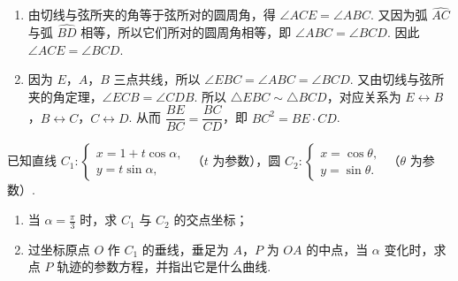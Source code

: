 \begin{solution}
\begin{enumerate}
\item 由切线与弦所夹的角等于弦所对的圆周角，得 \(\angle ACE=\angle ABC\). 又因为弧 \(\widehat{AC}\) 与弧 \(\widehat{BD}\) 相等，所以它们所对的圆周角相等，即 \(\angle ABC=\angle BCD\). 因此 \(\angle ACE=\angle BCD\).

\item 因为 \(E\)，\(A\)，\(B\) 三点共线，所以 \(\angle EBC=\angle ABC=\angle BCD\). 又由切线与弦所夹的角定理，\(\angle ECB=\angle CDB\). 所以 \(\triangle EBC\sim\triangle BCD\)，对应关系为 \(E\leftrightarrow B\)，\(B\leftrightarrow C\)，\(C\leftrightarrow D\). 从而 \(\dfrac{BE}{BC}=\dfrac{BC}{CD}\)，即 \(BC^2=BE\cdot CD\).
\end{enumerate}
\end{solution}

\begin{problem}
已知直线 \(C_{1}: \begin{cases}
x = 1 + t\cos \alpha,\\
y = t\sin \alpha,
\end{cases}\) （\(t\) 为参数），圆 \(C_{2}: \begin{cases}
x = \cos \theta,\\
y = \sin \theta.
\end{cases}\) （\(\theta\) 为参数）.

\begin{enumerate}
\item 当 \(\alpha = \frac{\pi}{3}\) 时，求 \(C_{1}\) 与 \(C_{2}\) 的交点坐标；
\item 过坐标原点 \(O\) 作 \(C_{1}\) 的垂线，垂足为 \(A\)，\(P\) 为 \(OA\) 的中点，当 \(\alpha\) 变化时，求点 \(P\) 轨迹的参数方程，并指出它是什么曲线.
\end{enumerate}
\end{problem}

